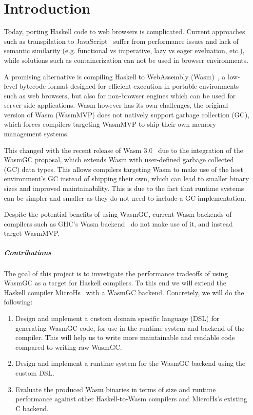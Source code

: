 \chapter{Introduction}\label{ch:introduction}
Today, porting Haskell code to web browsers is complicated. Current approaches such as transpilation to JavaScript~\cite{ghcjs} suffer from performance issues and lack of semantic similarity (e.g. functional vs imperative, lazy vs eager eveluation, etc.), while solutions such as containerization can not be used in browser environments.

A promising alternative is compiling Haskell to WebAssembly (Wasm)~\cite{wasm,ghcwasm,asterius}, a low-level bytecode format designed for efficient execution in portable environments such as web browsers, but also for non-browser engines which can be used for server-side applications. Wasm however has its own challenges, the original version of Wasm (WasmMVP) does not natively support garbage collection (GC), which forces compilers targeting WasmMVP to ship their own memory management systems. 

This changed with the recent release of Wasm 3.0~\cite{wasm3} due to the integration of the WasmGC proposal, which extends Wasm with user-defined garbage collected (GC) data types. This allows compilers targeting Wasm to make use of the host environment's GC instead of shipping their own, which can lead to smaller binary sizes and improved maintainability. This is due to the fact that runtime systems can be simpler and smaller as they do not need to include a GC implementation.

Despite the potential benefits of using WasmGC, current Wasm backends of compilers such as GHC's Wasm backend~\cite{ghcwasm} do not make use of it, and instead target WasmMVP. 

\paragraph{Contributions} The goal of this project is to investigate the performance tradeoffs of using WasmGC as a target for Haskell compilers. To this end we will extend the Haskell compiler MicroHs~\cite{microhs} with a WasmGC backend. Concretely, we will do the following:
\begin{enumerate}
    \item Design and implement a custom domain specific language (DSL) for generating WasmGC code, for use in the runtime system and backend of the compiler. This will help us to write more maintainable and readable code compared to writing raw WasmGC.
    \item Design and implement a runtime system for the WasmGC backend using the custom DSL.
    \item Evaluate the produced Wasm binaries in terms of size and runtime performance against other Haskell-to-Wasm compilers and MicroHs's existing C backend.
\end{enumerate}

